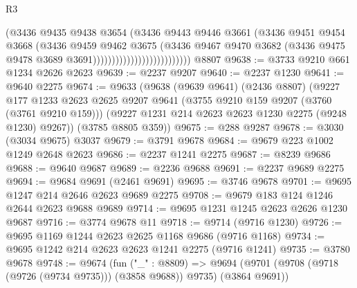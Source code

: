 \begin{lexlean}{R3}
\begin{coremodule}
                                            (@3436
                                              @9435
                                              @9438
                                              @3654
                                              (@3436
                                                @9443
                                                @9446
                                                @3661
                                                (@3436
                                                  @9451
                                                  @9454
                                                  @3668
                                                  (@3436
                                                    @9459
                                                    @9462
                                                    @3675
                                                    (@3436
                                                      @9467
                                                      @9470
                                                      @3682
                                                      (@3436
                                                        @9475
                                                        @9478
                                                        @3689
                                                        @3691))))))))))))))))))))))))))
    @8807
@9638 := @3733 @9210 @661 @1234 @2626 @2623
@9639 := @2237 @9207
@9640 := @2237 @1230
@9641 := @9640 @2275
@9674 := @9633
    (@9638
      (@9639 @9641)
      (@2436 @8807)
      (@9227
        @177
        @1233
        @2623
        @2625
        @9207
        @9641
        (@3755 @9210 @159 @9207 (@3760 (@3761 @9210 @159)))
        (@9227 @1231 @214 @2623 @2623 @1230 @2275 (@9248 @1230) @9267))
      (@3785 @8805 @359))
@9675 := @288 @9287
@9678 := @3030 (@3034 @9675) @3037
@9679 := @3791 @9678
@9684 := @9679 @223 @1002 @1249 @2648 @2623
@9686 := @2237 @1241 @2275
@9687 := @8239 @9686
@9688 := @9640 @9687
@9689 := @2236 @9688
@9691 := @2237 @9689 @2275
@9694 := @9684 @9691 (@2461 @9691)
@9695 := @3746 @9678
@9701 := @9695 @1247 @214 @2646 @2623 @9689 @2275
@9708 := @9679 @183 @124 @1246 @2644 @2623 @9688 @9689
@9714 := @9695 @1231 @1245 @2623 @2626 @1230 @9687
@9716 := @3774 @9678 @11
@9718 := @9714 (@9716 @1230)
@9726 := @9695 @1169 @1244 @2623 @2625 @1168 @9686 (@9716 @1168)
@9734 := @9695 @1242 @214 @2623 @2623 @1241 @2275 (@9716 @1241)
@9735 := @3780 @9678
@9748 := @9674
    (fun ("_" : @8809) =>
    @9694 (@9701 (@9708 (@9718 (@9726 (@9734 @9735))) (@3858 @9688)) @9735) (@3864 @9691))

\end{coremodule}
\end{lexlean}
